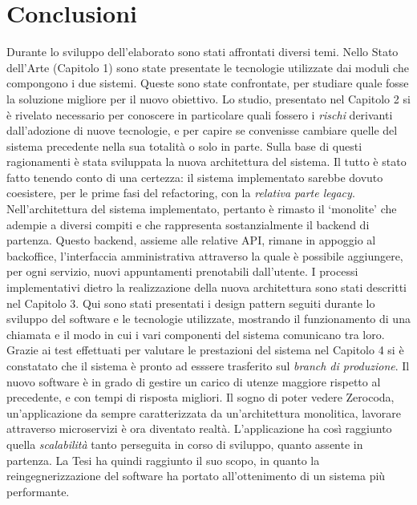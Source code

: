 \chapter*{Conclusioni}
\label{chap:conclusion}
Durante lo sviluppo dell'elaborato sono stati affrontati diversi temi. Nello Stato dell'Arte (Capitolo 1) sono state presentate le tecnologie utilizzate dai moduli che compongono i due sistemi. Queste sono state confrontate, per studiare quale fosse la soluzione migliore per il nuovo obiettivo. Lo studio, presentato nel Capitolo 2 si è rivelato necessario per conoscere in particolare quali fossero i \emph{rischi} derivanti dall'adozione di nuove tecnologie, e per capire se convenisse cambiare quelle del sistema precedente nella sua totalità o solo in parte. Sulla base di questi ragionamenti è stata sviluppata la nuova architettura del sistema. Il tutto è stato fatto tenendo conto di una certezza: il sistema implementato sarebbe dovuto coesistere, per le prime fasi del refactoring, con la \emph{relativa parte legacy}. Nell'architettura del sistema implementato, pertanto è rimasto il `monolite' che adempie a diversi compiti e che rappresenta sostanzialmente il backend di partenza. Questo backend, assieme alle relative API, rimane in appoggio al backoffice, l'interfaccia amministrativa attraverso la quale è possibile aggiungere, per ogni servizio, nuovi appuntamenti prenotabili dall'utente. I processi implementativi dietro la realizzazione della nuova architettura sono stati descritti nel Capitolo 3. Qui sono stati presentati i design pattern seguiti durante lo sviluppo del software e le tecnologie utilizzate, mostrando il funzionamento di una chiamata e il modo in cui i vari componenti del sistema comunicano tra loro. Grazie ai test effettuati per valutare le prestazioni del sistema nel Capitolo 4 si è constatato che il sistema è pronto ad esssere trasferito sul \emph{branch di produzione}. Il nuovo software è in grado di gestire un carico di utenze maggiore rispetto al precedente, e con tempi di risposta migliori. Il sogno di poter vedere Zerocoda, un'applicazione da sempre caratterizzata da un'architettura monolitica, lavorare attraverso microservizi è ora diventato realtà. L'applicazione ha così raggiunto quella \emph{scalabilità} tanto perseguita in corso di sviluppo, quanto assente in partenza. La Tesi ha quindi raggiunto il suo scopo, in quanto la reingegnerizzazione del software ha portato all'ottenimento di un sistema più performante.

